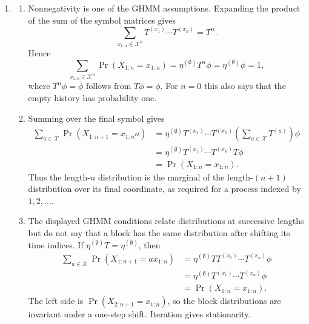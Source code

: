 \begin{solution}[ex:p3-4]
    \begin{enumerate}
      \item
        \begin{enumerate}
          \item Nonnegativity is one of the GHMM assumptions. Expanding the
            product of the sum of the symbol matrices gives
            \[
              \sum_{x_{1:n}\in\mathcal X^n}
                T^{(x_1)}\cdots T^{(x_n)}=T^n.
            \]
            Hence
            \[
              \sum_{x_{1:n}\in\mathcal X^n}
                \Pr(X_{1:n}=x_{1:n})
                =\eta^{(\emptyset)}T^n\phi
                =\eta^{(\emptyset)}\phi=1,
            \]
            where $T^n\phi=\phi$ follows from $T\phi=\phi$. For $n=0$
            this also says that the empty history has probability one.

          \item Summing over the final symbol gives
            \[
              \begin{aligned}
                \sum_{a\in\mathcal X}
                  \Pr(X_{1:n+1}=x_{1:n}a)
                  &=
                  \eta^{(\emptyset)}
                    T^{(x_1)}\cdots T^{(x_n)}
                    \left(\sum_{a\in\mathcal X}T^{(a)}\right)\phi\\
                  &=
                  \eta^{(\emptyset)}
                    T^{(x_1)}\cdots T^{(x_n)}T\phi\\
                  &=\Pr(X_{1:n}=x_{1:n}).
              \end{aligned}
            \]
            Thus the length-$n$ distribution is the marginal of the
            length-$(n+1)$ distribution over its final coordinate, as
            required for a process indexed by $1,2,\ldots$.

          \item The displayed GHMM conditions relate distributions at
            successive lengths but do not say that a block has the same
            distribution after shifting its time indices. If
            $\eta^{(\emptyset)}T=\eta^{(\emptyset)}$, then
            \[
              \begin{aligned}
                \sum_{a\in\mathcal X}
                  \Pr(X_{1:n+1}=a x_{1:n})
                  &=
                  \eta^{(\emptyset)}T
                    T^{(x_1)}\cdots T^{(x_n)}\phi\\
                  &=
                  \eta^{(\emptyset)}
                    T^{(x_1)}\cdots T^{(x_n)}\phi\\
                  &=\Pr(X_{1:n}=x_{1:n}).
              \end{aligned}
            \]
            The left side is
            $\Pr(X_{2:n+1}=x_{1:n})$, so the block distributions are
            invariant under a one-step shift. Iteration gives stationarity.
        \end{enumerate}


\end{enumerate}
\end{solution}

